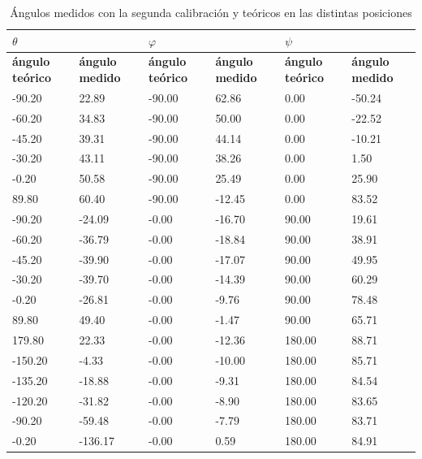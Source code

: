 \documentclass[main]{subfiles}
\begin{document}
\begin{table}
\begin{tabular}{|p{50pt}|p{50pt}|p{50pt}|p{51pt}|p{50pt}|p{50pt}|}
\hline
  
\multicolumn{2}{|p{113pt}|}{\cellcolor[gray]{0.6} $\theta$}  
& \multicolumn{2}{|p{114pt}|}{\cellcolor[gray]{0.6} $\varphi$}
& \multicolumn{2}{|p{113pt}|}{\cellcolor[gray]{0.6} $\psi$} 
\\ \hline 
   

 \multicolumn{1}{|p{50pt}|}{\cellcolor[gray]{0.7} \textbf{\'angulo te\'orico }} 
& \multicolumn{1}{|p{50pt}|}{\cellcolor[gray]{0.8} \textbf{ángulo medido}}
& \multicolumn{1}{|p{50pt}|}{\cellcolor[gray]{0.7} \textbf{\'angulo te\'orico }} 
& \multicolumn{1}{|p{50pt}|}{\cellcolor[gray]{0.8} \textbf{ángulo medido}}
& \multicolumn{1}{|p{50pt}|}{\cellcolor[gray]{0.7} \textbf{\'angulo te\'orico }} 
& \multicolumn{1}{|p{50pt}|}{\cellcolor[gray]{0.8} \textbf{ángulo medido}}
\\ \hline

 -90.20&  22.89&-90.00& 62.86&  0.00&-50.24\\ \hline
 -60.20&  34.83&-90.00& 50.00&  0.00&-22.52\\ \hline
 -45.20&  39.31&-90.00& 44.14&  0.00&-10.21\\ \hline
 -30.20&  43.11&-90.00& 38.26&  0.00&  1.50\\ \hline
  -0.20&  50.58&-90.00& 25.49&  0.00& 25.90\\ \hline
  89.80&  60.40&-90.00&-12.45&  0.00& 83.52\\ \hline
 -90.20& -24.09& -0.00&-16.70& 90.00& 19.61\\ \hline
 -60.20& -36.79& -0.00&-18.84& 90.00& 38.91\\ \hline
 -45.20& -39.90& -0.00&-17.07& 90.00& 49.95\\ \hline
 -30.20& -39.70& -0.00&-14.39& 90.00& 60.29\\ \hline
  -0.20& -26.81& -0.00& -9.76& 90.00& 78.48\\ \hline
  89.80&  49.40& -0.00& -1.47& 90.00& 65.71\\ \hline
 179.80&  22.33& -0.00&-12.36&180.00& 88.71\\ \hline
-150.20&  -4.33& -0.00&-10.00&180.00& 85.71\\ \hline
-135.20& -18.88& -0.00& -9.31&180.00& 84.54\\ \hline
-120.20& -31.82& -0.00& -8.90&180.00& 83.65\\ \hline
 -90.20& -59.48& -0.00& -7.79&180.00& 83.71\\ \hline
  -0.20&-136.17& -0.00&  0.59&180.00& 84.91\\ \hline
\end{tabular}
\caption{Ángulos medidos con la segunda calibración y teóricos en las distintas posiciones}
\label{tab:angulos}
\end{table} 
\end{document}
